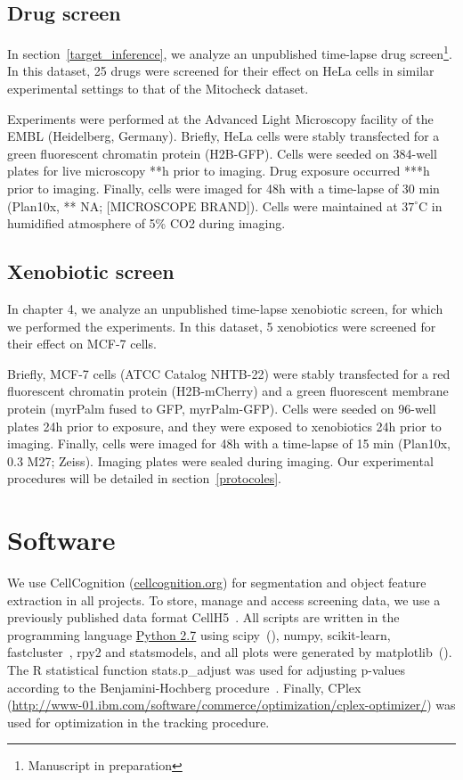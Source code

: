 \subsection{Drug screen}
In section~\ref{target_inference}, we analyze an unpublished time-lapse drug screen\footnote{Manuscript in preparation}. In this dataset, 25 drugs were screened for their effect on HeLa cells in similar experimental settings to that of the Mitocheck dataset.

Experiments were performed at the Advanced Light Microscopy facility of the EMBL (Heidelberg, Germany). Briefly, HeLa cells were stably transfected for a green fluorescent chromatin protein (H2B-GFP). Cells were seeded on 384-well plates for live microscopy **h prior to imaging. Drug exposure occurred ***h prior to imaging. Finally, cells were imaged for 48h with a time-lapse of 30 min (Plan10x, ** NA; [MICROSCOPE BRAND]). Cells were maintained at $37^\circ$C in humidified atmosphere of 5\% CO2 during imaging.

\subsection{Xenobiotic screen}
In chapter 4, we analyze an unpublished time-lapse xenobiotic screen, for which we performed the experiments. In this dataset, 5 xenobiotics were screened for their effect on MCF-7 cells.

Briefly, MCF-7 cells (ATCC\up{\textregistered} Catalog NHTB-22\texttrademark) were stably transfected for a red fluorescent chromatin protein (H2B-mCherry) and a green fluorescent membrane protein (myrPalm fused to GFP, myrPalm-GFP). Cells were seeded on 96-well plates 24h prior to exposure, and they were exposed to xenobiotics 24h prior to imaging. Finally, cells were imaged for 48h with a time-lapse of 15 min (Plan10x, 0.3 M27; Zeiss). Imaging plates were sealed during imaging. Our experimental procedures will be detailed in section~\ref{protocoles}.
\section{Software}
We use CellCognition \cite{cellcognition} (\href{http://cellcognition.org}{cellcognition.org}) for segmentation and object feature extraction in all projects. To store, manage and access
screening data, we use a previously published data format CellH5~\cite{Sommer2013}. All scripts are written in the programming language \href{http://www.python.org}{Python 2.7}
using scipy~(\cite{scipy}), numpy, scikit-learn, fastcluster~\cite{fastcluster}, rpy2 and statsmodels, and all plots were generated by matplotlib~(\cite{matplotlib}). The R statistical function stats.p\_adjust was used for adjusting p-values according to the Benjamini-Hochberg procedure~\cite{Benjamini1}. Finally, CPlex \\ (\href{http://www-01.ibm.com/software/commerce/optimization/cplex-optimizer/}{http://www-01.ibm.com/software/commerce/optimization/cplex-optimizer/}) was used for optimization in the tracking procedure.